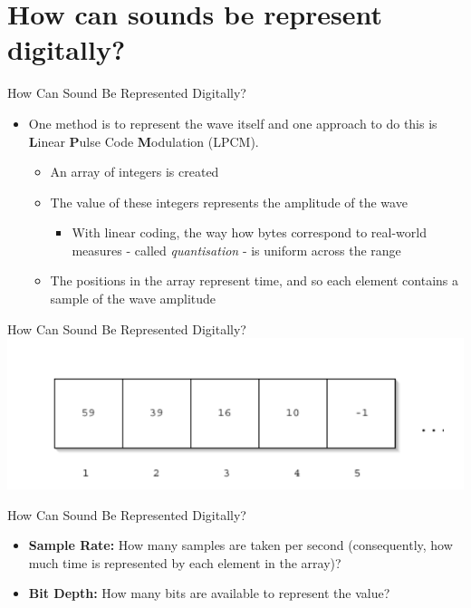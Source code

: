 \part{How can sounds be represent digitally?}
\frame{\partpage}

\begin{frame}{How Can Sound Be Represented Digitally?}
	\begin{itemize}
		\item One method is to represent the wave itself and one
		approach to do this is \textbf{L}inear \textbf{P}ulse Code \textbf{M}odulation (LPCM).
		\begin{itemize}
			\item An array of integers is created
			\item The value of these integers represents the amplitude of the wave
			\begin{itemize}
				\item  With linear coding, the way how bytes correspond to real-world
				measures - called \textit{quantisation} - is uniform across the range

			\end{itemize}
			\item The positions in the array represent time, and so each element
			contains a sample of the wave amplitude 
		\end{itemize}
	\end{itemize}
\end{frame}

\begin{frame}{How Can Sound Be Represented Digitally? }
	\includegraphics[width=\linewidth,height=0.7\textheight,keepaspectratio]{pcm_array}
\end{frame}

\begin{frame}{How Can Sound Be Represented Digitally?}
	\begin{itemize}
		\item\textbf{Sample Rate:} How many samples are taken per second (consequently,
		how much time is represented by each element in the
		array)?

		\item\textbf{Bit Depth:} How many bits are available to represent the value?
	\end{itemize}
\end{frame}

